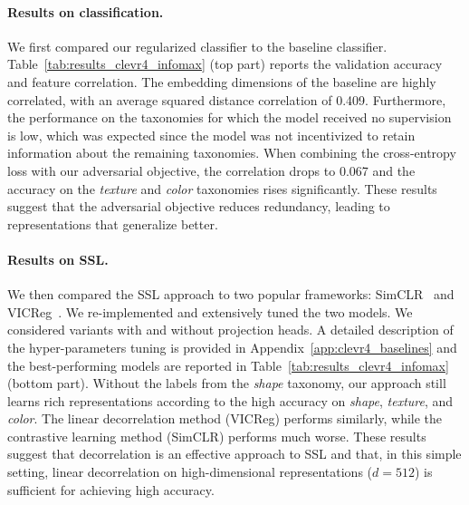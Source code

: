 \paragraph{Results on classification.}
We first compared our regularized classifier to the baseline classifier. Table~\ref{tab:results_clevr4_infomax} (top part) reports the validation accuracy and feature correlation. 
The embedding dimensions of the baseline are highly correlated, with an average squared distance correlation of 0.409. Furthermore, the performance on the taxonomies for which the model received no supervision is low, which was expected since the model was not incentivized to retain information about the remaining taxonomies. 
When combining the cross-entropy loss with our adversarial objective, the correlation drops to 0.067 and the accuracy on the \textit{texture} and \textit{color} taxonomies rises significantly. 
These results suggest that the adversarial objective reduces redundancy, leading to representations that generalize better. 

\paragraph{Results on SSL.}
We then compared the SSL approach to two popular frameworks: SimCLR~\citep{chen2020SimCLR_ssl} and VICReg~\citep{bardes2021vicreg_ssl}. 
We re-implemented and extensively tuned the two models. We considered variants with and without projection heads. A detailed description of the hyper-parameters tuning is provided in Appendix~\ref{app:clevr4_baselines} and the best-performing models are reported in Table~\ref{tab:results_clevr4_infomax} (bottom part). 
Without the labels from the \textit{shape} taxonomy, our approach still learns rich representations according to the high accuracy on \textit{shape}, \textit{texture}, and \textit{color}. 
The linear decorrelation method (VICReg) performs similarly, while the contrastive learning method (SimCLR) performs much worse. 
These results suggest that decorrelation is an effective approach to SSL and that, in this simple setting, linear decorrelation on high-dimensional representations ($d=512$) is sufficient for achieving high accuracy. 


